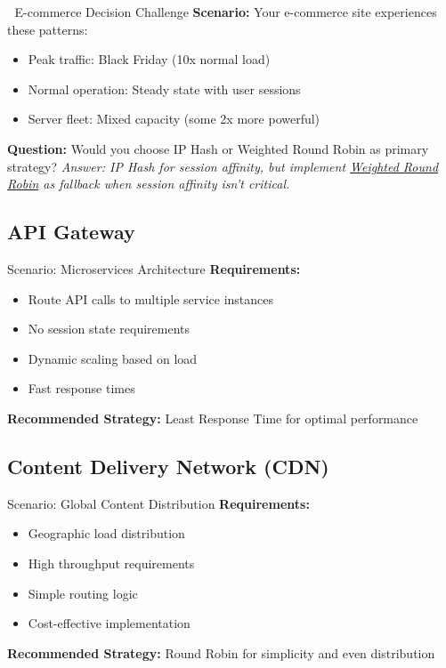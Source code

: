 \documentclass[12pt,a4paper]{article}
\begin{document}
\begin{quizbox}{🛒 E-commerce Decision Challenge}
\textbf{Scenario:} Your e-commerce site experiences these patterns:
\begin{itemize}
    \item Peak traffic: Black Friday (10x normal load)
    \item Normal operation: Steady state with user sessions
    \item Server fleet: Mixed capacity (some 2x more powerful)
\end{itemize}
\textbf{Question:} Would you choose IP Hash or Weighted Round Robin as primary strategy?
\textit{Answer: IP Hash for session affinity, but implement \hyperref[subsec:weighted]{Weighted Round Robin} as fallback when session affinity isn't critical.}
\end{quizbox}

\subsection{API Gateway}

\begin{successbox}{Scenario: Microservices Architecture}
\textbf{Requirements:}
\begin{itemize}
    \item Route API calls to multiple service instances
    \item No session state requirements
    \item Dynamic scaling based on load
    \item Fast response times
\end{itemize}

\textbf{Recommended Strategy:} Least Response Time for optimal performance
\end{successbox}

\subsection{Content Delivery Network (CDN)}

\begin{successbox}{Scenario: Global Content Distribution}
\textbf{Requirements:}
\begin{itemize}
    \item Geographic load distribution
    \item High throughput requirements
    \item Simple routing logic
    \item Cost-effective implementation
\end{itemize}

\textbf{Recommended Strategy:} Round Robin for simplicity and even distribution
\end{successbox}
\end{document}
